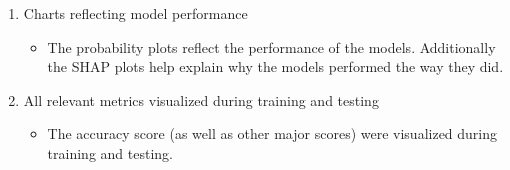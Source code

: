 \documentclass[12pt]{article}
\begin{document}
\begin{enumerate}
\begin{itemize}
        \end{itemize}
        \begin{enumerate}
            \item Charts reflecting model performance
            \begin{itemize}
                \item The probability plots reflect the performance of the models. Additionally the SHAP plots help explain why the models performed the way they did.
            \end{itemize}
            \item All relevant metrics visualized during training and testing
            \begin{itemize}
                \item The accuracy score (as well as other major scores) were visualized during training and testing.
            \end{itemize}
        \end{enumerate}
    \end{enumerate}
\end{document}
